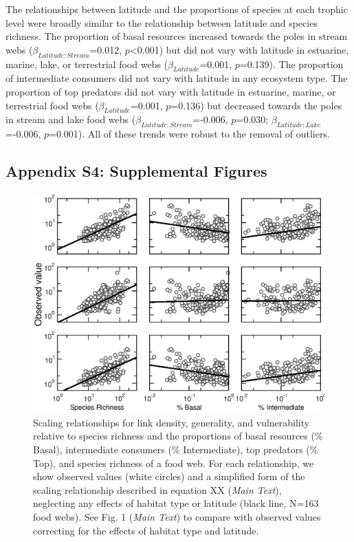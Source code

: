 \documentclass[12pt]{article}
\begin{document}
    The relationships between latitude and the proportions of species at each trophic level were broadly similar
    to the relationship between latitude and species richness. 
    The proportion of basal resources increased towards the poles in stream webs ($\beta_{Latitude:Stream}$=0.012, $p$\textless0.001) 
    but did not vary with latitude in estuarine, marine, lake, or terrestrial 
    food webs ($\beta_{Latitude}$=0.001, $p$=0.139).
    The proportion of intermediate consumers did not vary with latitude in any ecosystem type.
    The proportion of top predators did not vary with latitude in 
    estuarine, marine, or terrestrial food webs ($\beta_{Latitude}$=0.001, $p$=0.136) but decreased towards the poles in stream and lake food 
    webs ($\beta_{Latitude:Stream}$=-0.006, $p$=0.030; 
    $\beta_{Latitude:Lake}$=-0.006, $p$=0.001). 
    All of these trends were robust to the removal of outliers.

\newpage

\subsection*{Appendix S4: Supplemental Figures}

\begin{figure}[h]
\centerline{\includegraphics*[width=.75\textwidth]{Figures/by_TL/scaling_with_S/proportions/fitlines_nonts_observed.eps}}
\caption{Scaling relationships for link density, generality, 
and vulnerability relative to species richness and the proportions of basal resources (\% Basal),
intermediate consumers (\% Intermediate), top predators (\% Top), and species richness of a food web. 
For each relationship, we show observed values (white circles) and 
a simplified form of the scaling relationship described in equation XX (\emph{Main Text}), neglecting 
any effects of habitat type or latitude (black line, N=163 food webs). See Fig. 1 (\emph{Main Text}) to compare with 
observed values correcting for the effects of habitat type and latitude. }
\label{props_v_lat_obs}
\end{figure}
\end{document}
